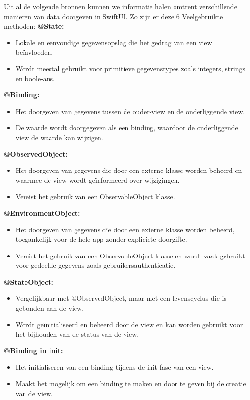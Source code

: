 Uit al de volgende bronnen kunnen we informatie halen omtrent verschillende manieren van data doorgeven in SwiftUI. Zo zijn er deze 6 Veelgebruikte methoden:
\newline\textbf{@State:}
\begin{itemize}
    \item {Lokale en eenvoudige gegevensopslag die het gedrag van een view beïnvloeden.}
    \item {Wordt meestal gebruikt voor primitieve gegevenstypes zoals integers, strings en boole-\newline ans.}
\end{itemize}
\textbf{@Binding:}
\begin{itemize}
    \item {Het doorgeven van gegevens tussen de ouder-view en de onderliggende view.}
    \item {De waarde wordt doorgegeven als een binding, waardoor de onderliggende view de waarde kan wijzigen.}
\end{itemize}
\textbf{@ObservedObject:}
\begin{itemize}
    \item {Het doorgeven van gegevens die door een externe klasse worden beheerd en waarmee de view wordt geïnformeerd over wijzigingen.}
    \item {Vereist het gebruik van een ObservableObject klasse.}
\end{itemize}
\textbf{@EnvironmentObject:}
\begin{itemize}
    \item {Het doorgeven van gegevens die door een externe klasse worden beheerd, toegankelijk voor de hele app zonder expliciete doorgifte.}
    \item {Vereist het gebruik van een ObservableObject-klasse en wordt vaak gebruikt voor gedeelde gegevens zoals gebruikersauthenticatie.}
\end{itemize}
\textbf{@StateObject:}
\begin{itemize}
    \item {Vergelijkbaar met @ObservedObject, maar met een levenscyclus die is gebonden aan de view.}
    \item {Wordt geïnitialiseerd en beheerd door de view en kan worden gebruikt voor het bijhouden van de status van de view.}
\end{itemize}
\textbf{@Binding in init:}
\begin{itemize}
    \item {Het initialiseren van een binding tijdens de init-fase van een view.}
    \item {Maakt het mogelijk om een binding te maken en door te geven bij de creatie van de view.}
\end{itemize}
